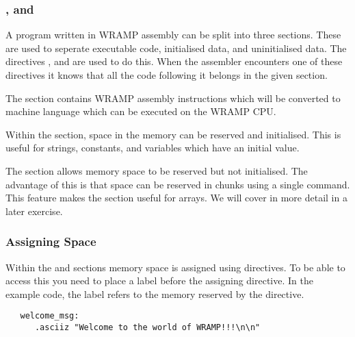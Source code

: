 \subsubsection{\text, \data and \bss}
A program written in WRAMP assembly can be split into three sections.
These are used to seperate executable code, initialised data, and
uninitialised data.  The directives \text, \data and \bss are used to
do this.  When the assembler encounters one of these directives it
knows that all the code following it belongs in the given section.

The \text section contains WRAMP assembly instructions which will be
converted to machine language which can be executed on the WRAMP CPU.

Within the \data section, space in the memory can be reserved and
initialised.  This is useful for strings, constants, and variables
which have an initial value.

The \bss section allows memory space to be reserved but not initialised.  The
advantage of this is that space can be reserved in chunks using a single
command.  This feature makes the \bss section useful for arrays.  We will
cover \bss in more detail in a later exercise.

\subsubsection{Assigning Space}
Within the \data and \bss sections memory space is assigned using directives. 
To be able
to access this you need to place a label before the assigning directive. In the
example code, the label  refers to the memory reserved 
by the \asciiz directive.
%
\begin{verbatim}
   welcome_msg:
      .asciiz "Welcome to the world of WRAMP!!!\n\n"
\end{verbatim}



